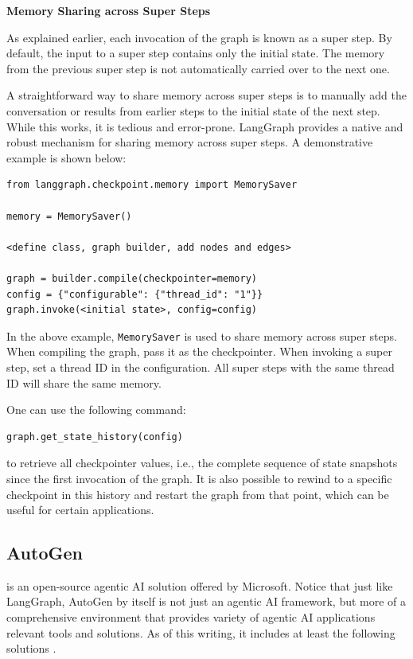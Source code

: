 \vspace{0.1in}
\noindent \textbf{Memory Sharing across Super Steps}
\vspace{0.1in}

As explained earlier, each invocation of the graph is known as a super step. By default, the input to a super step contains only the initial state. The memory from the previous super step is not automatically carried over to the next one. 

A straightforward way to share memory across super steps is to manually add the conversation or results from earlier steps to the initial state of the next step. While this works, it is tedious and error-prone. LangGraph provides a native and robust mechanism for sharing memory across super steps. A demonstrative example is shown below:
\begin{lstlisting}
from langgraph.checkpoint.memory import MemorySaver

memory = MemorySaver()

<define class, graph builder, add nodes and edges>

graph = builder.compile(checkpointer=memory)
config = {"configurable": {"thread_id": "1"}}
graph.invoke(<initial state>, config=config)
\end{lstlisting}

In the above example, \texttt{MemorySaver} is used to share memory across super steps. When compiling the graph, pass it as the checkpointer. When invoking a super step, set a thread ID in the configuration. All super steps with the same thread ID will share the same memory.

One can use the following command:
\begin{lstlisting}
graph.get_state_history(config)
\end{lstlisting}
to retrieve all checkpointer values, i.e., the complete sequence of state snapshots since the first invocation of the graph. It is also possible to rewind to a specific checkpoint in this history and restart the graph from that point, which can be useful for certain applications.

\subsection{AutoGen}

 is an open-source agentic AI solution offered by Microsoft. Notice that just like LangGraph, AutoGen by itself is not just an agentic AI framework, but more of a comprehensive environment that provides variety of agentic AI applications relevant tools and solutions. As of this writing, it includes at least the following solutions \cite{autogen2025}.

